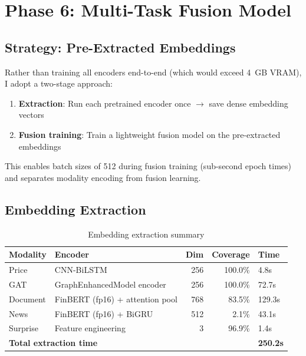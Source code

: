 \documentclass[12pt,a4paper]{article}
\begin{document}
\section{Phase 6: Multi-Task Fusion Model}
\label{sec:phase6}

\subsection{Strategy: Pre-Extracted Embeddings}

Rather than training all encoders end-to-end (which would exceed 4~GB VRAM), I adopt a two-stage approach:

\begin{enumerate}
    \item \textbf{Extraction}: Run each pretrained encoder once $\rightarrow$ save dense embedding vectors
    \item \textbf{Fusion training}: Train a lightweight fusion model on the pre-extracted embeddings
\end{enumerate}

This enables batch sizes of 512 during fusion training (sub-second epoch times) and separates modality encoding from fusion learning.

\subsection{Embedding Extraction}

\begin{table}[H]
\centering
\begin{tabular}{llrrl}
\toprule
\textbf{Modality} & \textbf{Encoder} & \textbf{Dim} & \textbf{Coverage} & \textbf{Time} \\
\midrule
Price & CNN-BiLSTM & 256 & 100.0\% & 4.8s \\
GAT & GraphEnhancedModel encoder & 256 & 100.0\% & 72.7s \\
Document & FinBERT (fp16) + attention pool & 768 & 83.5\% & 129.3s \\
News & FinBERT (fp16) + BiGRU & 512 & 2.1\% & 43.1s \\
Surprise & Feature engineering & 3 & 96.9\% & 1.4s \\
\midrule
\multicolumn{4}{l}{\textbf{Total extraction time}} & \textbf{250.2s} \\
\bottomrule
\end{tabular}
\caption{Embedding extraction summary}
\label{tab:extraction}
\end{table}
\end{document}
